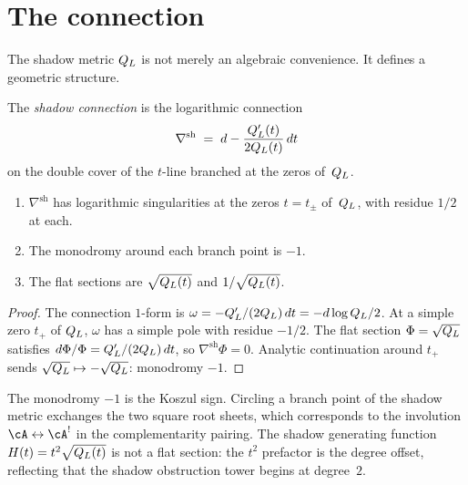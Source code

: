 \section{The connection}
\label{sec:comp-connection}

The shadow metric $Q_L$ is not merely an algebraic
convenience. It defines a geometric structure.

\begin{definition}
\label{def:comp-shadow-connection}
The \emph{shadow connection} is the logarithmic connection
\begin{equation}\label{eq:comp-shadow-connection}
 \nabla^{\mathrm{sh}}
 \;=\; d - \frac{Q_L'(t)}{2Q_L(t)}\, dt
\end{equation}
on the double cover of the $t$-line branched at the zeros
of~$Q_L$.
\end{definition}

\begin{proposition}
\label{prop:comp-shadow-connection-properties}
\ClaimStatusProvedHere
\begin{enumerate}[label=\textup{(\roman*)}]
\item $\nabla^{\mathrm{sh}}$ has logarithmic singularities at
 the zeros $t = t_\pm$ of~$Q_L$, with residue $1/2$
 at each.
\item The monodromy around each branch point is $-1$.
\item The flat sections are $\sqrt{Q_L(t)}$ and
 $1/\sqrt{Q_L(t)}$.
\end{enumerate}
\end{proposition}

\begin{proof}
The connection $1$-form is
$\omega = -Q_L'/(2Q_L)\,dt
= -d\log Q_L/2$. At a simple zero $t_+$ of
$Q_L$, $\omega$ has a simple pole with residue $-1/2$.
The flat section $\Phi = \sqrt{Q_L}$ satisfies
$d\Phi/\Phi = Q_L'/(2Q_L)\,dt$, so
$\nabla^{\mathrm{sh}}\Phi = 0$. Analytic continuation around
$t_+$ sends $\sqrt{Q_L} \mapsto -\sqrt{Q_L}$:
monodromy $-1$.
\end{proof}

The monodromy $-1$ is the Koszul sign. Circling a branch
point of the shadow metric exchanges the two square root sheets,
which corresponds to the involution
$\cA \leftrightarrow \cA^!$ in the complementarity pairing.
The shadow generating function
$H(t) = t^2 \sqrt{Q_L(t)}$ is not a flat
section: the $t^2$ prefactor is the degree offset, reflecting
that the shadow obstruction tower begins at degree~$2$.

